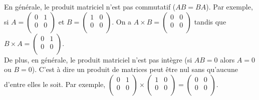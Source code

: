 \documentclass{book}
\begin{document}
\begin{Definition}
\end{Definition}


\begin{Remarque}En générale, le produit matriciel n'est pas commutatif ($AB = BA$). Par exemple, si $A=\begin{pmatrix}0&1\\0&0\\\end{pmatrix}$ et $B=\begin{pmatrix}1&0\\0&0\\\end{pmatrix}$. On a $A\times B=\begin{pmatrix}0&0\\0&0\\\end{pmatrix}$ tandis que 
$B\times A = \begin{pmatrix}0&1\\0&0\\\end{pmatrix}$.\\
De plus, en générale, le produit matriciel n'est pas intègre (si $AB =0$ alors $A=0$ ou $B=0$). C'est à dire un produit de matrices peut être nul sans qu'aucune d'entre elles le soit. Par exemple, $\begin{pmatrix}0&1\\0&0\\\end{pmatrix}\times \begin{pmatrix}1&0\\0&0\\\end{pmatrix}=\begin{pmatrix}0&0\\0&0\\\end{pmatrix}.$ 
\end{Remarque}
\end{document}
